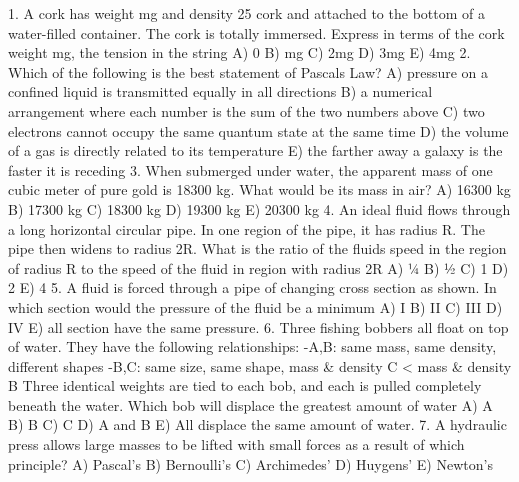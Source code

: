 







1. A cork has weight mg and density 25%
cork and attached to the bottom of a water-filled container. The cork is totally
immersed. Express in terms of the cork weight mg, the tension in the string
A) 0
B) mg
C) 2mg
D) 3mg
E) 4mg
2. Which of the following is the best statement of Pascals Law?
A) pressure on a confined liquid is transmitted equally in all directions
B) a numerical arrangement where each number is the sum of the two numbers above
C) two electrons cannot occupy the same quantum state at the same time
D) the volume of a gas is directly related to its temperature
E) the farther away a galaxy is the faster it is receding
3. When submerged under water, the apparent mass of one cubic meter of pure gold is 18300 kg. What would be
its mass in air?
A) 16300 kg
B) 17300 kg C) 18300 kg
D) 19300 kg
E) 20300 kg
4. An ideal fluid flows through a long horizontal circular pipe. In one region of the pipe, it has radius R. The pipe
then widens to radius 2R. What is the ratio of the fluids speed in the region of radius R to the speed of the fluid
in region with radius 2R
A) 1⁄4
B) 1⁄2
C) 1
D) 2
E) 4
5. A fluid is forced through a pipe of changing cross section as shown. In which section would the pressure of the
fluid be a minimum
A) I
B) II
C) III
D) IV
E) all section have the same pressure.
6. Three fishing bobbers all float on top of water. They have the following relationships:
-A,B: same mass, same density, different shapes
-B,C: same size, same shape,
mass & density C < mass & density B
Three identical weights are tied to each bob, and each is pulled completely beneath the water. Which bob will
displace the greatest amount of water
A) A
B) B
C) C
D) A and B
E) All displace the same amount of water.
7. A hydraulic press allows large masses to be lifted with small forces as a result of which principle?
A) Pascal’s
B) Bernoulli’s
C) Archimedes’
D) Huygens’
E) Newton’s



